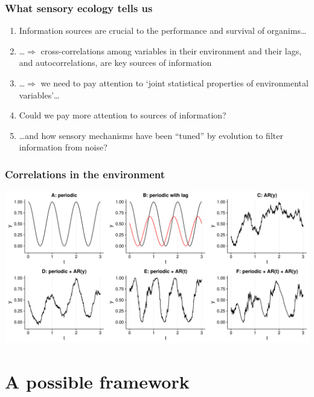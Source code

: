 \documentclass[10pt]{beamer}\usepackage[]{graphicx}\usepackage[]{color}
\begin{document}
\begin{frame}[<+->]
\frametitle{What sensory ecology tells us}
\begin{enumerate}
  \item Information sources are crucial to the performance and survival of organims\ldots
  \item \ldots $\Rightarrow$ cross-correlations among variables in their environment and their lags, and autocorrelations, are key sources of information
  \item \ldots $\Rightarrow$ we need to pay attention to `joint statistical properties of environmental variables'\ldots
  \item Could we pay more attention to sources of information?
  \item \ldots and how sensory mechanisms have been ``tuned'' by evolution to filter information from noise?
\end{enumerate}
\end{frame}

\begin{frame}
  \frametitle{Correlations in the environment}
  \includegraphics[width=\linewidth]{figures/cor_examples2.pdf}
\end{frame}

\section{A possible framework}
\end{document}

